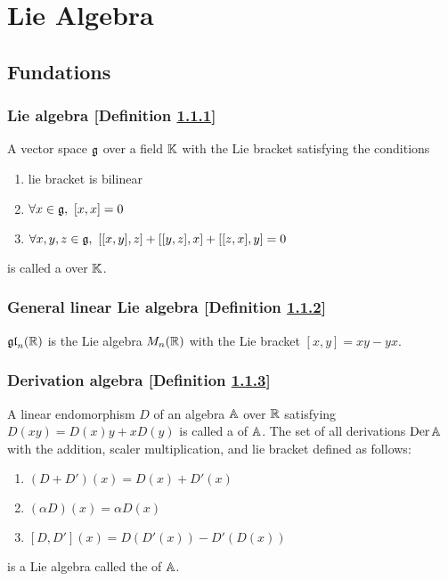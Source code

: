 \newcommand{\gl}{\g{gl}}
\renewcommand{\sl}{\g{sl}}
\renewcommand{\o}{\g{o}}
\section{Lie Algebra}
\subsection{Fundations}
\subsubsection{Lie algebra [Definition \ref{lie-algebra}]}\label{lie-algebra}
A vector space $\mathfrak{g}$ over a field $\mathbb{K}$ with the Lie bracket satisfying the conditions
\begin{enumerate}
\item lie bracket is bilinear
\item $\forall x \in \mathfrak{g},\ [x,x] = 0$
\item $\forall x, y, z \in \g g,\ [[x,y],z]+[[y,z],x]+[[z,x],y] = 0$
\end{enumerate}
is called a  over $\mathbb{K}$.

\subsubsection{General linear Lie algebra [Definition \ref{general-linear-lie-algebra}]}\label{general-linear-lie-algebra}
$\mathfrak{gl}_n(\mathbb{R})$ is the Lie algebra $M_n(\mathbb{R})$ with the Lie bracket $[x,y] = xy - yx$.

\subsubsection{Derivation algebra [Definition \ref{derivation-algebra}]}\label{derivation-algebra}
A linear endomorphism $D$ of an algebra $\mathbb{A}$ over $\mathbb{R}$ satisfying $D(xy) = D(x)y + xD(y)$ is called a  of $\mathbb{A}$. The set of all derivations $\mathrm{Der}\, \mathbb{A}$ with the addition, scaler multiplication, and lie bracket defined as follows:
\begin{enumerate}
\item $(D+D')(x) = D(x)+D'(x)$
\item $(\alpha D)(x) = \alpha D(x)$
\item $[D,D'](x) = D(D'(x)) - D'(D(x))$  
\end{enumerate}
is a Lie algebra called the  of $\mathbb{A}$.

